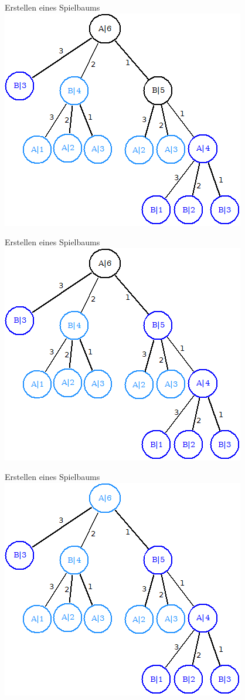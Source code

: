 \documentclass[18pt]{beamer}
\begin{document}
\begin{frame}{Erstellen eines Spielbaums}
\includegraphics[scale=0.4]{baum16.png}
\end{frame}

\begin{frame}{Erstellen eines Spielbaums}
\includegraphics[scale=0.4]{baum17.png}
\end{frame}

\begin{frame}{Erstellen eines Spielbaums}
\includegraphics[scale=0.4]{baum18.png}
\end{frame}
\end{document}
